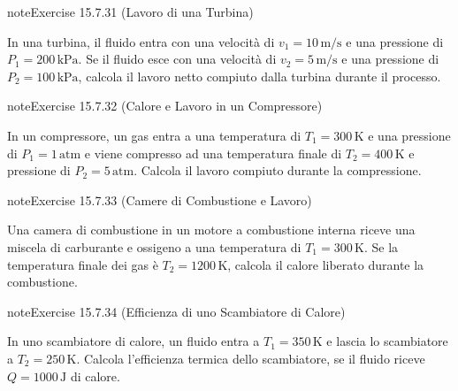 \documentclass[letterpaper,10pt,italian]{jupyterBook}
\begin{document}
\begin{sphinxadmonition}{note}{Exercise 15.7.31 (Lavoro di una Turbina)}



\sphinxAtStartPar
In una turbina, il fluido entra con una velocità di \(v_1 = 10 \, \text{m/s}\) e una pressione di \(P_1 = 200 \, \text{kPa}\). Se il fluido esce con una velocità di \(v_2 = 5 \, \text{m/s}\) e una pressione di \(P_2 = 100 \, \text{kPa}\), calcola il lavoro netto compiuto dalla turbina durante il processo.
\end{sphinxadmonition}
 \label{exercise:ch/thermodynamics/principles-problems-exercise-31}

\begin{sphinxadmonition}{note}{Exercise 15.7.32 (Calore e Lavoro in un Compressore)}



\sphinxAtStartPar
In un compressore, un gas entra a una temperatura di \(T_1 = 300 \, \text{K}\) e una pressione di \(P_1 = 1 \, \text{atm}\) e viene compresso ad una temperatura finale di \(T_2 = 400 \, \text{K}\) e pressione di \(P_2 = 5 \, \text{atm}\). Calcola il lavoro compiuto durante la compressione.
\end{sphinxadmonition}
 \label{exercise:ch/thermodynamics/principles-problems-exercise-32}

\begin{sphinxadmonition}{note}{Exercise 15.7.33 (Camere di Combustione e Lavoro)}



\sphinxAtStartPar
Una camera di combustione in un motore a combustione interna riceve una miscela di carburante e ossigeno a una temperatura di \(T_1 = 300 \, \text{K}\). Se la temperatura finale dei gas è \(T_2 = 1200 \, \text{K}\), calcola il calore liberato durante la combustione.
\end{sphinxadmonition}
 \label{exercise:ch/thermodynamics/principles-problems-exercise-33}

\begin{sphinxadmonition}{note}{Exercise 15.7.34 (Efficienza di uno Scambiatore di Calore)}



\sphinxAtStartPar
In uno scambiatore di calore, un fluido entra a \(T_1 = 350 \, \text{K}\) e lascia lo scambiatore a \(T_2 = 250 \, \text{K}\). Calcola l’efficienza termica dello scambiatore, se il fluido riceve \(Q = 1000 \, \text{J}\) di calore.
\end{sphinxadmonition}
 \label{exercise:ch/thermodynamics/principles-problems-exercise-34}
\end{document}
